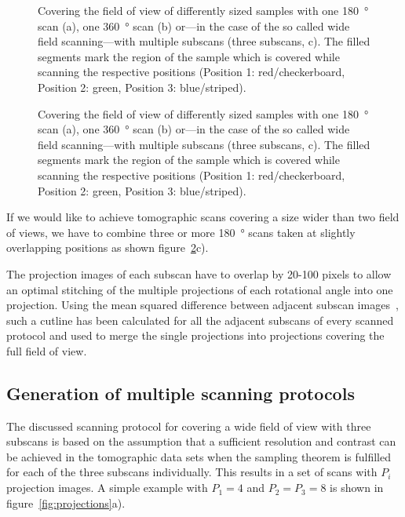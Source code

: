 \ifiucr
	\begin{figure}
		\centering
		\caption{Covering the field of view of differently sized samples with one \SI{180}{\degree} scan (a), one \SI{360}{\degree} scan (b) or---in the case of the so called wide field scanning---with multiple subscans (three subscans, c). The filled segments mark the region of the sample which is covered while scanning the respective positions (Position 1: red/checkerboard, Position 2: green, Position 3: blue/striped).}%
		\label{fig:scanning-possibilities}%
	\end{figure}
\else
	\begin{figure}
		\label{subfig:scanning-possibilities}%
		\caption{Covering the field of view of differently sized samples with one \SI{180}{\degree} scan (a), one \SI{360}{\degree} scan (b) or---in the case of the so called wide field scanning---with multiple subscans (three subscans, c). The filled segments mark the region of the sample which is covered while scanning the respective positions (Position 1: red/checkerboard, Position 2: green, Position 3: blue/striped).}%
		\label{fig:scanning-possibilities}%
	\end{figure}
\fi

If we would like to achieve tomographic scans covering a size wider than two field of views, we have to combine three or more \SI{180}{\degree} scans taken at slightly overlapping positions as shown figure~\ref{fig:scanning-possibilities}c).

The projection images of each subscan have to overlap by 20-100 pixels to allow an optimal stitching of the multiple projections of each rotational angle into one projection. Using the mean squared difference between adjacent subscan images~\cite{Hintermueller2009}, such a cutline has been calculated for all the adjacent subscans of every scanned protocol and used to merge the single projections into projections covering the full field of view.

\subsection{Generation of multiple scanning protocols}%
The discussed scanning protocol for covering a wide field of view with three subscans is based on the assumption that a sufficient resolution and contrast can be achieved in the tomographic data sets when the sampling theorem is fulfilled for each of the three subscans individually. This results in a set of scans with $P_{i}$ projection images. A simple example with $P_{1}=4$ and $P_{2}=P_{3}=8$ is shown in figure~\ref{fig:projections}a).

